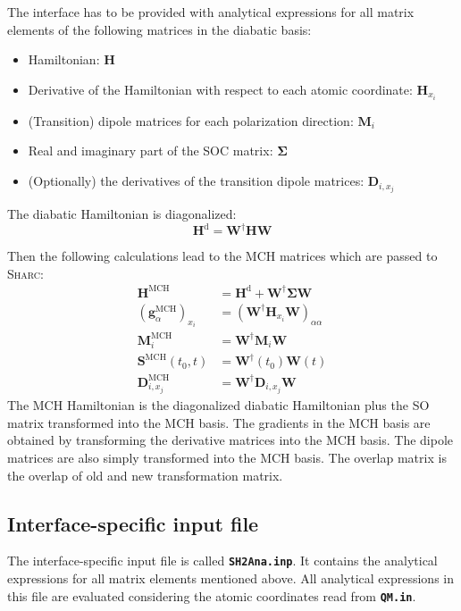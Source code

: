 \documentclass[a4paper,11pt,DIV=15,openany,twoside=false]{scrbook}
\newcommand{\sharc}{\textsc{Sharc}}
\newcommand{\ttt}[1]{\textbf{\texttt{#1}}}
\begin{document}
The interface has to be provided with analytical expressions for all matrix elements of the following matrices in the diabatic basis:
\begin{itemize}
  \item Hamiltonian: $\mathbf{H}$
  \item Derivative of the Hamiltonian with respect to each atomic coordinate: $\mathbf{H}_{x_i}$
  \item (Transition) dipole matrices for each polarization direction: $\mathbf{M}_i$
  \item Real and imaginary part of the SOC matrix: $\boldsymbol{\Sigma}$
  \item (Optionally) the derivatives of the transition dipole matrices: $\mathbf{D}_{i,x_j}$
\end{itemize}

The diabatic Hamiltonian is diagonalized:
\begin{equation}
  \mathbf{H}^{\text{d}}=\mathbf{W}^\dagger\mathbf{H}\mathbf{W}
\end{equation}


Then the following calculations lead to the MCH matrices which are passed to \sharc:
\begin{align}
  \mathbf{H}^{\text{MCH}}&=\mathbf{H}^{\text{d}}+\mathbf{W}^\dagger\boldsymbol{\Sigma}\mathbf{W}\\
  \left(\mathbf{g}^{\text{MCH}}_\alpha\right)_{x_i}&=\left(\mathbf{W}^\dagger\mathbf{H}_{x_i}\mathbf{W}\right)_{\alpha\alpha}\\
  \mathbf{M}^{\text{MCH}}_i&=\mathbf{W}^\dagger\mathbf{M}_i\mathbf{W}\\
  \mathbf{S}^{\text{MCH}}(t_0,t)&=\mathbf{W}^\dagger(t_0)\mathbf{W}(t)\\
  \mathbf{D}^{\text{MCH}}_{i,x_j}&=\mathbf{W}^\dagger\mathbf{D}_{i,x_j}\mathbf{W}
\end{align}
The MCH Hamiltonian is the diagonalized diabatic Hamiltonian plus the SO matrix transformed into the MCH basis. The gradients in the MCH basis are obtained by transforming the derivative matrices into the MCH basis. The dipole matrices are also simply transformed into the MCH basis. The overlap matrix is the overlap of old and new transformation matrix.

\subsection{Interface-specific input file}

The interface-specific input file is called \ttt{SH2Ana.inp}. It contains the analytical expressions for all matrix elements mentioned above. All analytical expressions in this file are evaluated considering the atomic coordinates read from \ttt{QM.in}.
\end{document}
